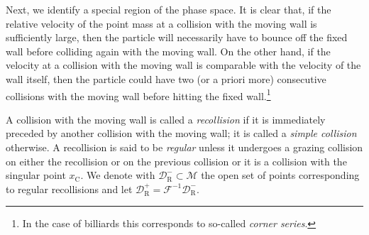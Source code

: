 \documentclass[AHL, Unicode, longabstracts,published]{cedram}
\newcommand{\inv}{^{-1}}
\newcommand{\crit}{\mathrm{C}}
\newcommand{\xc}{x_\crit}
\newcommand{\cm}{\mathcal{F}}
\newcommand{\cell}{\mathcal{D}}
\newcommand{\csp}{\mathcal{M}}
\newcommand{\recoPrivate}{\mathrm{R}}
\newcommand{\reco}{{\cell^-_{\recoPrivate}}}
\newcommand{\backReco}{{\cell^+_{\recoPrivate}}}
\begin{document}
Next, we identify a special region of the phase space. It is clear that, if the relative velocity of the point mass at a collision with the moving wall is sufficiently large, then the particle will necessarily have to bounce off the fixed wall before colliding again with the moving wall. On the other hand, if the velocity at a collision with the moving wall is comparable with the velocity of the wall itself, then the particle could have two (or a priori more) consecutive collisions with the moving wall before hitting the fixed wall.\footnote{ In the case of billiards this corresponds to so-called
\emph{corner series}.}
\begin{defi}
A collision with the moving wall is called a \emph{recollision} if it is immediately preceded by another collision with the moving wall; it is called a \emph{simple collision} otherwise. A recollision is said to be \emph{regular} unless it undergoes a grazing collision on either the recollision or on the previous collision or it is a collision with the singular point $\xc$. We denote with $\reco\subset\csp$ the open set of points corresponding to regular recollisions and let $\backReco=\cm\inv\reco$.
\end{defi}
\end{document}
